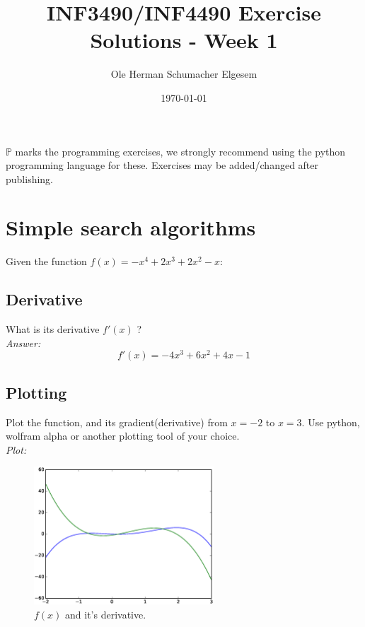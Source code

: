 \documentclass{article}           %
\title{\vspace{-2cm}INF3490/INF4490 Exercise Solutions - Week 1}
\author{Ole Herman Schumacher Elgesem}
\date{\today}
\newcommand\marginsymbol[1][0pt]{%
  \tabto*{0cm}\makebox[\dimexpr-1cm-#1\relax][r]{$\mathbb{P}$}\tabto*{\TabPrevPos}}
\begin{document}
    \renewcommand\marginsymbol[1][0pt]{%
  \tabto*{0cm}\makebox[-1cm][c]{$\mathbb{P}$}\tabto*{\TabPrevPos}}

\maketitle
\(\mathbb{P}\) marks the programming exercises, we strongly recommend using
the python programming language for these. Exercises may be added/changed
after publishing.

\section{Simple search algorithms}

Given the function \(f(x) = -x^4 + 2x^3 + 2x^2 - x\):

\subsection{Derivative}
What is its derivative \(f'(x)\) ?\\

\emph{Answer:}
\[f'(x) = -4x^3 + 6x^2 + 4x - 1\]

\subsection{Plotting \marginsymbol}
Plot the function, and its gradient(derivative) from \(x=-2\) to \(x=3\). Use
python, wolfram alpha or another plotting tool of your choice.\\

\emph{Plot:}
\begin{figure}[H]
\begin{center}
\includegraphics[width=0.6\textwidth]{eps/w1e1b.eps}
\caption{\(f(x)\) and it's derivative.}
\label{fig:w1e1b}
\end{center}
\end{figure}
\end{document}
